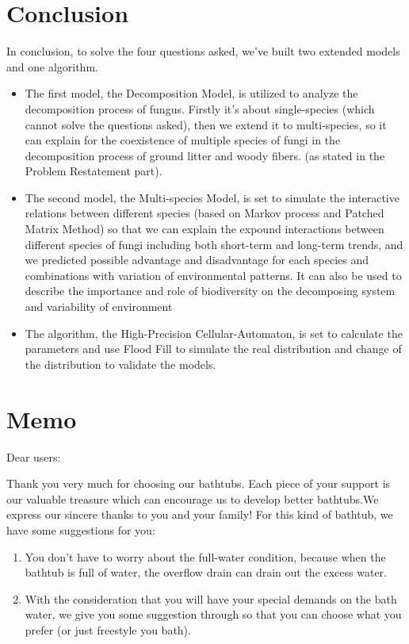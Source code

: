 \documentclass[12pt]{article}
\begin{document}
\section{Conclusion}
In conclusion, to solve the four questions asked, we’ve built two extended models and one algorithm.
\begin{itemize}
\item The first model, the Decomposition Model, is utilized to analyze the decomposition process of fungus. Firstly it’s about single-species (which cannot solve the questions asked), then we extend it to multi-species, so it can explain for the coexistence of multiple species of fungi in the decomposition process of ground litter and woody fibers. (as stated in the Problem Restatement part).
\item The second model, the Multi-species Model, is set to simulate the interactive relations between different species (based on Markov process and Patched Matrix Method) so that we can explain the expound interactions between different species of fungi including both short-term and long-term trends, and we predicted possible advantage and disadvantage for each species and combinations with variation of environmental patterns. It can also be used to describe the importance and role of biodiversity on the decomposing system and variability of environment
\item The algorithm, the High-Precision Cellular-Automaton, is set to calculate the parameters and use Flood Fill to simulate the real distribution and change of the distribution to validate the models.
\end{itemize}
\newpage



\section*{Memo}

	\begin{flushleft}
		Dear users:
	\end{flushleft}
	
	Thank you very much for choosing our bathtubs. Each piece of your support is our valuable treasure
	which can encourage us to develop better bathtubs.We express our sincere thanks to you and your
	family!
	For this kind of bathtub, we have some suggestions for you:
	\begin{enumerate}[\bf 1.]
		\item You don't have to worry about the full-water condition, because when the bathtub is full
		of water, the overflow drain can drain out the excess water.
		\item With the consideration that you will have your special demands on the bath water, we give
		you some suggestion through so that you can choose what you prefer
		(or just freestyle you bath).
		
	\end{enumerate}
\end{document}
